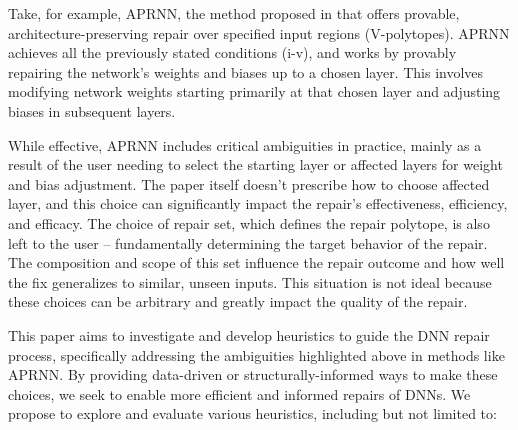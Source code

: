 \documentclass{article}
\begin{document}
Take, for example, APRNN, the method proposed in \cite{tao_architecture-preserving_2023} that offers provable, architecture-preserving repair over specified input regions (V-polytopes).
APRNN achieves all the previously stated conditions (i-v), and works by provably repairing the network's weights and biases up to a chosen layer.
This involves modifying network weights starting primarily at that chosen layer and adjusting biases in subsequent layers.

While effective, APRNN includes critical ambiguities in practice, mainly as a result of the user needing to select the starting layer or affected layers for weight and bias adjustment.
The paper itself doesn't prescribe how to choose affected layer, and this choice can significantly impact the repair's effectiveness, efficiency, and efficacy.
The choice of repair set, which defines the repair polytope, is also left to the user -- fundamentally determining the target behavior of the repair.
The composition and scope of this set influence the repair outcome and how well the fix generalizes to similar, unseen inputs.
This situation is not ideal because these choices can be arbitrary and greatly impact the quality of the repair.

This paper aims to investigate and develop heuristics to guide the DNN repair process, specifically addressing the ambiguities highlighted above in methods like APRNN. 
By providing data-driven or structurally-informed ways to make these choices, we seek to enable more efficient and informed repairs of DNNs.
We propose to explore and evaluate various heuristics, including but not limited to:

\newpage
\end{document}
